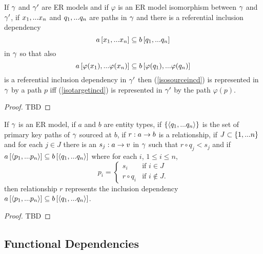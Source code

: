 \begin{lemma}
If $\gamma$ and $\gamma'$ are ER models and  if  $\varphi$ is an ER model isomorphism between $\gamma$  and $\gamma'$,  
if $x_1,...x_n$ and $q_1,...q_n$ are paths in 
$\gamma$
and there is a referential  inclusion dependency
\begin{equation}
\label{isosourceincd}
a\left[x_1,...x_n\right]\subseteq b\left[q_1,...q_n\right]
\end{equation}
 in $\gamma$ 
so that also 
\begin{equation}
\label{isotargetincd}
a\left[\varphi(x_1),...\varphi(x_n)\right]\subseteq b\left[\varphi(q_1),...\varphi(q_n)\right]
\end{equation}
is a referential inclusion dependency in $\gamma'$
then (\ref{isosourceincd}) is represented in $\gamma$ by a path $p$
iff (\ref{isotargetincd}) is represented in $\gamma'$ by the path $\varphi(p)$.
\end{lemma}
\begin{proof}
TBD
\end{proof}

\begin{lemma}
\label{incdrepresentationshortcut}
If $\gamma$ is an ER model, if $a$ and $b$ are entity types, if $\left\{\langle q_1,...q_n\rangle\right\}$ is the set
of primary key paths of $\gamma$ sourced at $b$, if $r:a \rightarrow b$ is a relationship, 
if $J \subset \left\{1,...n\right\}$ and for each $j \in J$ there is an $s_j:a \rightarrow v$ in $\gamma$ such that $r \circ q_j < s_j$  and if $a\left[\langle p_1,...p_n\rangle\right]\subseteq b\left[\langle q_1,...q_n\rangle\right]$
where for each $i$, $1 \leq i \leq n$, 
$$
p_i =
\begin{cases} 
    s_i         & \mbox{if $i \in J$} \\
    r \circ q_i & \mbox{if $i \notin J$.}
\end{cases} 
$$
then relationship $r$ represents the inclusion dependency  $a\left[\langle p_1,...p_n\rangle\right]\subseteq b\left[\langle q_1,...q_n\rangle\right]$.
\end{lemma}
\begin{proof}
TBD
\end{proof}


\subsection{Functional Dependencies}

